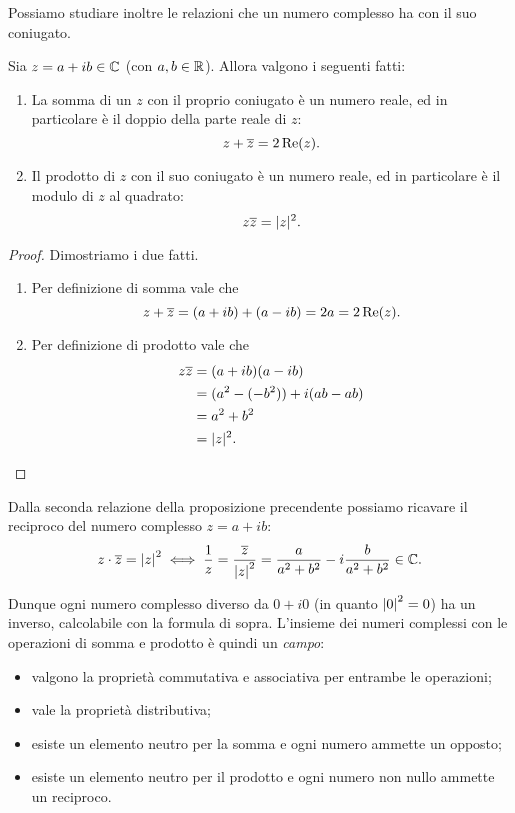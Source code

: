 Possiamo studiare inoltre le relazioni che un numero complesso ha con il suo coniugato.

\begin{proposition}\label{somma_prodotto_col_coniugato}
    Sia $z = a+ib \in \C$ (con $a, b \in \R$). Allora valgono i seguenti fatti:
    \begin{enumerate}[label={(\roman*)}]
        \item La somma di un $z$ con il proprio coniugato è un numero reale, ed in particolare è il doppio della parte reale di $z$: \[
            z + \conj{z} = 2\Re{z}.
        \]
        \item Il prodotto di $z$ con il suo coniugato è un numero reale, ed in particolare è il modulo di $z$ al quadrato: \[
            z\conj{z} = \abs{z}^2.
        \]
    \end{enumerate}
\end{proposition}
\begin{proof}
    Dimostriamo i due fatti.
    \begin{enumerate}[label={(\roman*)}]
        \item Per definizione di somma vale che \[
           z + \conj{z} = (a + ib) + (a - ib) = 2a = 2\Re z.   
        \]
        \item Per definizione di prodotto vale che \begin{align*}
            z\conj{z} &= (a + ib)(a - ib)\\ 
            &= (a^2 - (-b^2)) + i(ab - ab) \\
            &= a^2 + b^2 \\
            &= \abs{z}^2. \qedhere
        \end{align*} 
    \end{enumerate}
\end{proof}

Dalla seconda relazione della proposizione precendente possiamo ricavare il reciproco del numero complesso $z = a+ib$:
\begin{equation}
    z \cdot \conj z = \abs*{z}^2 
    \iff \frac{1}{z} = \frac{\conj z}{\abs*{z}^2} = \frac{a}{a^2 + b^2} - i\frac{b}{a^2 + b^2} \in \C.
\end{equation}

Dunque ogni numero complesso diverso da $0 + i0$ (in quanto $\abs*{0}^2 = 0$) ha un inverso, calcolabile con la formula di sopra. L'insieme dei numeri complessi con le operazioni di somma e prodotto è quindi un \emph{campo}: \begin{itemize}
    \item valgono la proprietà commutativa e associativa per entrambe le operazioni;
    \item vale la proprietà distributiva;
    \item esiste un elemento neutro per la somma e ogni numero ammette un opposto;
    \item esiste un elemento neutro per il prodotto e ogni numero non nullo ammette un reciproco.
\end{itemize}

